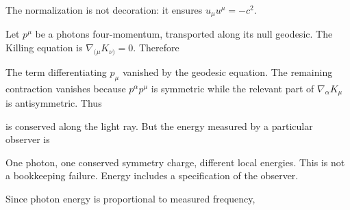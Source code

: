 \documentclass[
  11pt,
  letterpaper,
  oneside,
  openany]{scrbook}
\begin{document}
The normalization is not decoration: it ensures \(u_\mu u^\mu=-c^2\).

Let \(p^\mu\) be a photon\textquotesingle s four-momentum, transported
along its null geodesic. The Killing equation is
\(\nabla_{(\mu}K_{\nu)}=0\). Therefore

\begin{center}
\begingroup
{}
\ifdim\wd\grmathbox>\linewidth
\resizebox{\linewidth}{!}{\usebox{\grmathbox}}
\else\usebox{\grmathbox}\fi
\endgroup
\end{center}

The term differentiating \(p_\mu\) vanished by the geodesic equation.
The remaining contraction vanishes because \(p^\alpha p^\mu\) is
symmetric while the relevant part of \(\nabla_\alpha K_\mu\) is
antisymmetric. Thus

\begin{center}
\begingroup
{}
\ifdim\wd\grmathbox>\linewidth
\resizebox{\linewidth}{!}{\usebox{\grmathbox}}
\else\usebox{\grmathbox}\fi
\endgroup
\end{center}

is conserved along the light ray. But the energy measured by a
particular observer is

\begin{center}
\begingroup
{}
\ifdim\wd\grmathbox>\linewidth
\resizebox{\linewidth}{!}{\usebox{\grmathbox}}
\else\usebox{\grmathbox}\fi
\endgroup
\end{center}

One photon, one conserved symmetry charge, different local energies.
This is not a bookkeeping failure. Energy includes a specification of
the observer.

Since photon energy is proportional to measured frequency,

\begin{center}
\begingroup
{}
\ifdim\wd\grmathbox>\linewidth
\resizebox{\linewidth}{!}{\usebox{\grmathbox}}
\else\usebox{\grmathbox}\fi
\endgroup
\end{center}
\end{document}
